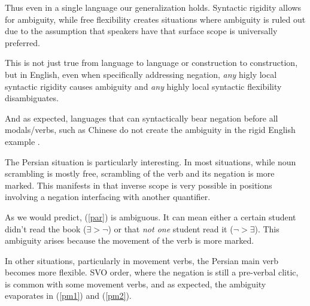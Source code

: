 \documentclass{article}
\begin{document}
Thus even in a single language our generalization holds.
Syntactic rigidity allows for ambiguity, while free flexibility creates situations where ambiguity is ruled out due to the assumption that speakers have that surface scope is universally preferred.

This is not just true from language to language or construction to construction, but in English, even when specifically addressing negation, \emph{any} higly local syntactic rigidity causes ambiguity and \emph{any} highly local syntactic flexibility disambiguates.

And as expected, languages that can syntactically bear negation before all modals/verbs, such as Chinese do not create the ambiguity in the rigid English example \parencite{ernst98}.

\begin{exe}
\end{exe}

The Persian situation is particularly interesting. In most situations, while noun scrambling is mostly free, scrambling of the verb and its negation is more marked. This manifests in that inverse scope is very possible in positions involving a negation interfacing with another quantifier.

\begin{exe}
\end{exe}

As we would predict, (\ref{par}) is ambiguous. It can mean either a certain student didn't read the book ($\exists > \neg$) or that \emph{not one} student read it ($\neg > \exists$). This ambiguity arises because the movement of the verb is more marked.

In other situations, particularly in movement verbs, the Persian main verb becomes more flexible. SVO order, where the negation is still a pre-verbal clitic, is common with some movement verbs, and as expected, the ambiguity evaporates in (\ref{pm1}) and (\ref{pm2}).
\end{document}

